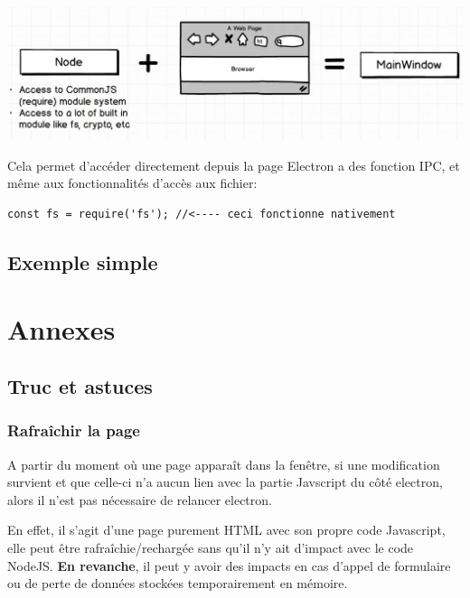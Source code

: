 \documentclass[12pt,oneside]{scrbook}
\begin{document}
\begin{center}
\includegraphics[width=\textwidth]{./img/electron_ajout.jpg}
\label{fig1}
\end{center}

Cela permet d'accéder directement depuis la page Electron a des fonction IPC, et même aux fonctionnalités d'accès aux fichier:
\begin{verbatim}
const fs = require('fs'); //<---- ceci fonctionne nativement
\end{verbatim}

\section{Exemple simple}






\chapter{Annexes}
\section{Truc et astuces}
\subsection{Rafraîchir la page}
A partir du moment où une page apparaît dans la fenêtre, si une modification survient et que celle-ci n'a aucun lien avec la partie Javscript du côté electron, alors il n'est pas nécessaire de relancer electron.

En effet, il s'agit d'une page purement HTML avec son propre code Javascript, elle peut être rafraîchie/rechargée sans qu'il n'y ait d'impact avec le code NodeJS. \textbf{En revanche}, il peut y avoir des impacts en cas d'appel de formulaire ou de perte de données stockées temporairement en mémoire.
\end{document}
